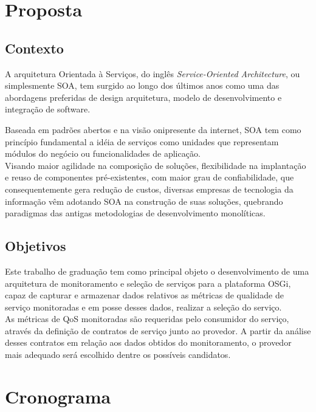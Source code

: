 \chapter{Proposta}
\section{Contexto}
\label{pr:contex}

A arquitetura Orientada à Serviços, do inglês \textit{Service-Oriented Architecture}, ou simplesmente SOA, tem surgido ao longo dos últimos anos como uma das abordagens preferidas de design arquitetura, modelo de desenvolvimento e integração de software.

Baseada em padrões abertos e na visão onipresente da internet, SOA tem como princípio fundamental a idéia de serviços como unidades que representam módulos do negócio ou funcionalidades de aplicação.
\\

Visando maior agilidade na composição de soluções, flexibilidade na implantação e reuso de componentes pré-existentes, com maior grau de confiabilidade, que consequentemente gera redução de custos, diversas empresas de tecnologia da informação vêm adotando SOA na construção de suas soluções, quebrando paradigmas das antigas metodologias de desenvolvimento monolíticas.



\newpage
\section{Objetivos}
\label{pr:objectives}

Este trabalho de graduação tem como principal objeto o desenvolvimento de uma arquitetura de monitoramento e seleção de serviços para a plataforma OSGi, capaz de capturar e armazenar dados relativos as métricas de qualidade de serviço monitoradas e em posse desses dados, realizar a seleção do serviço.
\\

As métricas de QoS monitoradas são requeridas pelo consumidor do serviço, através da definição de contratos de serviço junto ao provedor. A partir da análise desses contratos em relação aos dados obtidos do monitoramento, o provedor mais adequado será escolhido dentre os possíveis candidatos.

\newpage
\chapter{Cronograma}
\label{pr:chrono}

